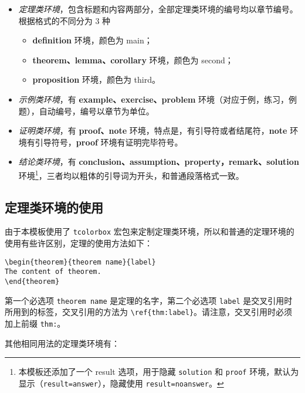 \documentclass[cn,11pt]{elegantbook}
\begin{document}
\begin{itemize}
\item \textit{定理类环境}，包含标题和内容两部分，全部定理类环境的编号均以章节编号。根据格式的不同分为 3 种
   \begin{itemize}
      \item \textcolor{main}{\textbf{definition}} 环境，颜色为 \textcolor{main}{main}；
      \item \textcolor{second}{\textbf{theorem、lemma、corollary}} 环境，颜色为 \textcolor{second} {second}；
      \item \textcolor{third}{\textbf{proposition}} 环境，颜色为 \textcolor{third}{third}。
   \end{itemize}
\item \textit{示例类环境}，有 \textbf{example、exercise、problem} 环境（对应于例，练习，例题），自动编号，编号以章节为单位。
\item \textit{证明类环境}，有 \textbf{proof、note} 环境，特点是，有引导符或者结尾符，\textbf{note} 环境有引导符号，\textbf{proof} 环境有证明完毕符号。
\item \textit{结论类环境}，有 \textbf{conclusion、assumption、property，remark、solution} 环境\footnote{本模板还添加了一个 result 选项，用于隐藏 \lstinline{solution} 和 \lstinline{proof} 环境，默认为显示（\lstinline{result=answer}），隐藏使用 \lstinline{result=noanswer}。}，三者均以粗体的引导词为开头，和普通段落格式一致。
\end{itemize}

\subsection{定理类环境的使用}
由于本模板使用了 \lstinline{tcolorbox} 宏包来定制定理类环境，所以和普通的定理环境的使用有些许区别，定理的使用方法如下：
\begin{lstlisting}
\begin{theorem}{theorem name}{label}
The content of theorem.
\end{theorem}
\end{lstlisting}

第一个必选项 \lstinline{theorem name} 是定理的名字，第二个必选项 \lstinline{label} 是交叉引用时所用到的标签，交叉引用的方法为 \verb|\ref{thm:label}|。请注意，交叉引用时必须加上前缀 \lstinline{thm:}。

其他相同用法的定理类环境有：
\end{document}
